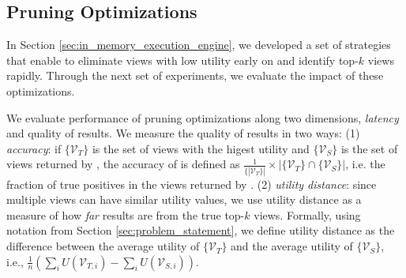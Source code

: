 
\subsection{Pruning Optimizations}
\label{sec:custom_execution_engine_expts}
In Section \ref{sec:in_memory_execution_engine}, we developed a set of strategies that enable \SeeDB to eliminate views with low utility early on and identify top-$k$ views rapidly.
Through the next set of experiments, we evaluate 
the impact of these optimizations.

We evaluate performance of pruning optimizations along two dimensions, {\em latency} and
quality of results.
We measure the quality of results in two ways: 
(1) {\em accuracy}: if $\{\mathcal{V}_T\}$
is the set of views with the higest utility and $\{\mathcal{V}_S\}$ is the set of views returned by
\SeeDB, the accuracy of \SeeDB is defined as $\frac{1}{\{|\mathcal{V}_T\}|} \times 
|\{\mathcal{V}_T\} \cap \{\mathcal{V}_S\}|$, i.e. the
fraction of true positives in the views returned by \SeeDB. (2) {\em utility distance}: since multiple
views can have similar utility values, we use utility distance as a measure of how {\it far} \SeeDB 
results are from the true top-$k$ views. 
Formally, using notation from Section \ref{sec:problem_statement}, we define utility distance as the difference between the average utility of $\{\mathcal{V}_T\}$ 
and the average utility of $\{\mathcal{V}_S\}$, i.e., $\frac{1}{n}(\sum_{i}U(\mathcal{V}_{T,i}) - 
\sum_{i}U(\mathcal{V}_{S,i}))$.

